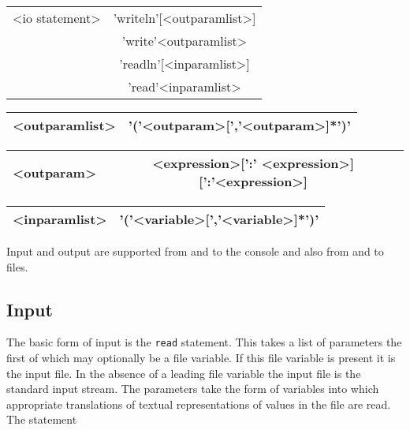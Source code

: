 {\vspace{0.3cm}
{\centering \begin{tabular}{|c|c|}
\hline 
<io statement>&
'writeln'{[}<outparamlist>{]}\\
&
'write'<outparamlist>\\
&
'readln'{[}<inparamlist>{]}\\
&
'read'<inparamlist>\\
\hline 
\end{tabular}\par}
\vspace{0.3cm}

\vspace{0.3cm}
{\centering \begin{tabular}{|c|c|}
\hline 
<outparamlist>&
'('<outparam>{[}','<outparam>{]}{*}')'\\
\hline 
\end{tabular}\par}
\vspace{0.3cm}

\vspace{0.3cm}
{\centering \begin{tabular}{|c|c|}
\hline 
<outparam>&
<expression>{[}':' <expression>{]} {[}':'<expression>{]} \\
\hline 
\end{tabular}\par}
\vspace{0.3cm}

\vspace{0.3cm}
{\centering \begin{tabular}{|c|c|}
\hline 
<inparamlist>&
'('<variable>{[}','<variable>{]}{*}')'\\
\hline 
\end{tabular}\par}
\vspace{0.3cm}

Input and output are supported from and to the console and also from and to
files. 


\subsection{Input}

The basic form of input is the \texttt{read} statement. This takes a list of
parameters the first of which may optionally be a file variable. If this file
variable is present it is the input file. In the absence of a leading file variable
the input file is the standard input stream. The parameters take the form of
variables into which appropriate translations of textual representations of
values in the file are read. The statement 

}
